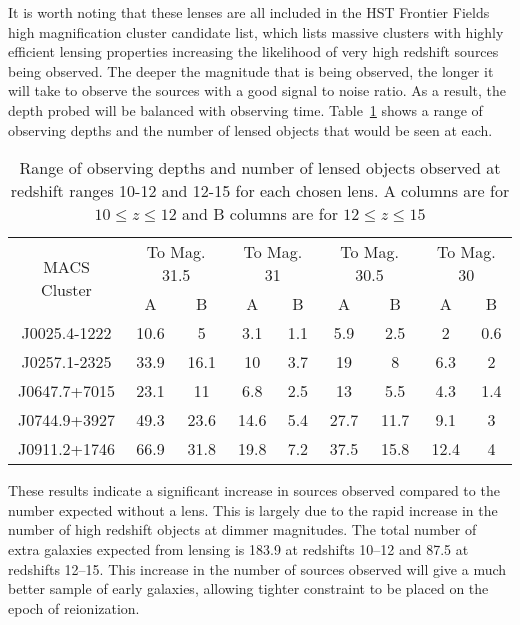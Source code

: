		It is worth noting that these lenses are all included in the HST Frontier Fields high magnification cluster candidate list, which lists massive clusters with highly efficient lensing properties increasing the likelihood of very high redshift sources being observed\cite{HST_strong_magnification}. The deeper the magnitude that is being observed, the longer it will take to observe the sources with a good signal to noise ratio. As a result, the depth probed will be balanced with observing time. Table~\ref{tab:observing_depths_and_number_of_lensed_objects} shows a range of observing depths and the number of lensed objects that would be seen at each.
		\begin{table}[htbp]
			\begin{center}
				\begin{tabular}{c||c|c|c|c|c|c|c|c}
		\multirow{2}{*}{MACS Cluster} & \multicolumn{2}{c|}{To Mag. 31.5}	&\multicolumn{2}{c|}{To Mag. 31} &\multicolumn{2}{c|}{To Mag. 30.5}	&\multicolumn{2}{c}{To Mag. 30}\\
					\cline{2-9}
						&A	&B	&A	&B	&A	&B	&A	&B\\
					\hline\hline
					J0025.4-1222	&10.6	&5	&3.1	&1.1	&5.9	&2.5	&2	&0.6\\
					J0257.1-2325	&33.9	&16.1	&10	&3.7	&19	&8	&6.3	&2\\
					J0647.7+7015	&23.1	&11	&6.8	&2.5	&13	&5.5	&4.3	&1.4\\
					J0744.9+3927	&49.3	&23.6	&14.6	&5.4	&27.7	&11.7	&9.1	&3\\
					J0911.2+1746	&66.9	&31.8	&19.8	&7.2	&37.5	&15.8	&12.4	&4
				\end{tabular}
			\end{center}
			\caption{Range of observing depths and number of lensed objects observed at redshift ranges 10-12 and 12-15 for each chosen lens. A columns are for $10\le z\le 12$ and B columns are for $12\le z\le 15$\label{tab:observing_depths_and_number_of_lensed_objects}}
		\end{table}

		These results indicate a significant increase in sources observed compared to the number expected without a lens. This is largely due to the rapid increase in the number of high redshift objects at dimmer magnitudes. The total number of extra galaxies expected from lensing is 183.9 at redshifts 10--12 and 87.5 at redshifts 12--15. This increase in the number of sources observed will give a much better sample of early galaxies, allowing tighter constraint to be placed on the epoch of reionization.

